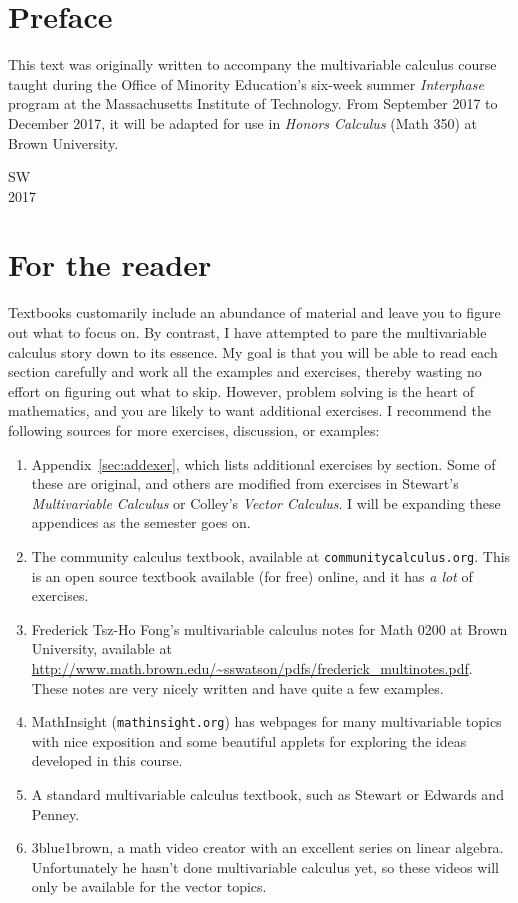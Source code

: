 \documentclass{watsonbook}
\begin{document}
 



\chapter*{Preface} 

\pagecolor{white} 

This text was originally written to accompany the multivariable
calculus course taught during the Office of Minority Education's
six-week summer \textit{Interphase} program at the Massachusetts
Institute of Technology. From September 2017 to December 2017, it will
be adapted for use in \textit{Honors Calculus} (Math 350) at Brown
University. 


SW \\
2017

\chapter*{For the reader}

Textbooks customarily include an abundance of material and leave you
to figure out what to focus on. By contrast, I have attempted to pare
the multivariable calculus story down to its essence. My goal is that
you will be able to read each section carefully and work all the
examples and exercises, thereby wasting no effort on figuring out what
to skip. However, problem solving is the heart of mathematics, and you
are likely to want additional exercises. I recommend the following
sources for more exercises, discussion, or examples: 
\begin{enumerate}[itemsep = 3pt]
\item Appendix~\ref{sec:addexer}, which lists additional exercises by
  section. Some of these are original, and others are
  modified from exercises in 
  Stewart's \textit{Multivariable Calculus} or Colley's \textit{Vector
    Calculus}. I will be expanding these appendices as the semester
  goes on. 
\item The community calculus textbook, available at
  \texttt{communitycalculus.org}. This is an open source textbook available (for
  free) online, and it has \textit{a lot} of exercises. 
\item Frederick Tsz-Ho Fong's multivariable calculus notes for Math 0200 at
  Brown University, available at
  \href{http://www.math.brown.edu/~sswatson/pdfs/frederick_multinotes.pdf}{\url{http://www.math.brown.edu/~sswatson/pdfs/frederick\_multinotes.pdf}}. These
  notes are very nicely written and have quite a few examples. 
\item MathInsight (\texttt{mathinsight.org}) has webpages for many
  multivariable topics with nice exposition and some beautiful applets for exploring the
  ideas developed in this course. 
\item A standard multivariable calculus textbook, such as Stewart
  or Edwards and Penney. 
\item 3blue1brown, a math video creator with an excellent series on
  linear algebra. Unfortunately he hasn't done multivariable calculus
  yet, so these videos will only be available for the vector topics. 
 \end{enumerate}
\end{document}
